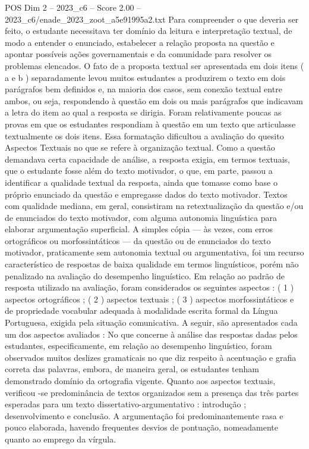 \begin{textsample}{POS Dim 2 – 2023\_c6 – Score 2.00 – 2023\_c6/enade\_2023\_zoot\_a5e91995a2.txt}
Para compreender o que deveria ser feito, o estudante necessitava ter domínio da leitura e interpretação textual, de modo a entender o enunciado, estabelecer a relação proposta na questão e apontar possíveis ações governamentais e da comunidade para resolver os problemas elencados.
O fato de a proposta textual ser apresentada em dois itens ( a e b ) separadamente levou muitos estudantes a produzirem o texto em dois parágrafos bem definidos e, na maioria dos casos, sem conexão textual entre ambos, ou seja, respondendo à questão em dois ou mais parágrafos que indicavam a letra do item ao qual a resposta se dirigia.
Foram relativamente poucas as provas em que os estudantes respondiam à questão em um texto que articulasse textualmente os dois itens.
Essa formatação dificultou a avaliação do quesito Aspectos Textuais no que se refere à organização textual.
Como a questão demandava certa capacidade de análise, a resposta exigia, em termos textuais, que o estudante fosse além do texto motivador, o que, em parte, passou a identificar a qualidade textual da resposta, ainda que tomasse como base o próprio enunciado da questão e empregasse dados do texto motivador.
Textos com qualidade mediana, em geral, consistiram na retextualização da questão e/ou de enunciados do texto motivador, com alguma autonomia linguística para elaborar argumentação superficial.
A simples cópia — às vezes, com erros ortográficos ou morfossintáticos — da questão ou de enunciados do texto motivador, praticamente sem autonomia textual ou argumentativa, foi um recurso característico de respostas de baixa qualidade em termos linguísticos, porém não penalizado na avaliação do desempenho linguístico.
Em relação ao padrão de resposta utilizado na avaliação, foram considerados os seguintes aspectos : ( 1 ) aspectos ortográficos ; ( 2 ) aspectos textuais ; ( 3 ) aspectos morfossintáticos e de propriedade vocabular adequada à modalidade escrita formal da Língua Portuguesa, exigida pela situação comunicativa.
A seguir, são apresentados cada um dos aspectos avaliados : No que concerne à análise das respostas dadas pelos estudantes, especificamente, em relação ao desempenho linguístico, foram observados muitos deslizes gramaticais no que diz respeito à acentuação e grafia correta das palavras, embora, de maneira geral, os estudantes tenham demonstrado domínio da ortografia vigente.
Quanto aos aspectos textuais, verificou -se predominância de textos organizados sem a presença das três partes esperadas para um texto dissertativo-argumentativo : introdução ; desenvolvimento e conclusão.
A argumentação foi predominantemente rasa e pouco elaborada, havendo frequentes desvios de pontuação, nomeadamente quanto ao emprego da vírgula.

\end{textsample}
